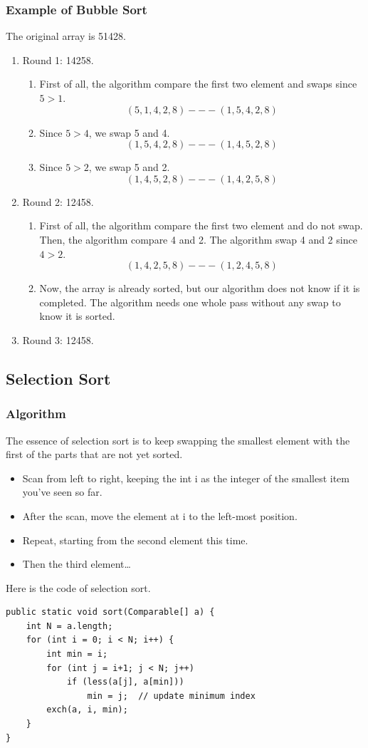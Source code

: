 \documentclass[letterpaper,12pt]{article}
\begin{document}
\subsubsection{Example of Bubble Sort}
The original array is 51428.
\begin{enumerate}
    \item Round 1: 14258.
    \begin{enumerate}
        \item First of all, the algorithm compare the first two element and swaps since $5>1$. $$(5,1,4,2,8)---(1,5,4,2,8)$$
        \item Since $5>4$, we swap 5 and 4. $$(1,5,4,2,8)---(1,4,5,2,8)$$
        \item Since $5>2$, we swap 5 and 2. $$(1,4,5,2,8)---(1,4,2,5,8)$$
    \end{enumerate}
    \item Round 2: 12458.
    \begin{enumerate}
        \item First of all, the algorithm compare the first two element and do not swap. Then, the algorithm compare 4 and 2. The algorithm swap 4 and 2 since $4>2$. $$(1,4,2,5,8)---(1,2,4,5,8)$$
        \item Now, the array is already sorted, but our algorithm does not know if it is completed. The algorithm needs one whole pass without any swap to know it is sorted.
    \end{enumerate}
    \item Round 3: 12458.
\end{enumerate}

\subsection{Selection Sort}
\subsubsection{Algorithm}
The essence of selection sort is to keep swapping the smallest element with the first of the parts that are not yet sorted.
\begin{itemize}
    \item Scan from left to right, keeping the int i as the integer of the smallest item you’ve seen so far.
    \item After the scan, move the element at i to the left-most position.
    \item Repeat, starting from the second element this time.
    \item Then the third element…
\end{itemize}
Here is the code of selection sort.
\begin{verbatim}
public static void sort(Comparable[] a) {
    int N = a.length;
    for (int i = 0; i < N; i++) {
        int min = i;
        for (int j = i+1; j < N; j++)
            if (less(a[j], a[min]))
                min = j;  // update minimum index
        exch(a, i, min);
    }
}
\end{verbatim}
\end{document}
